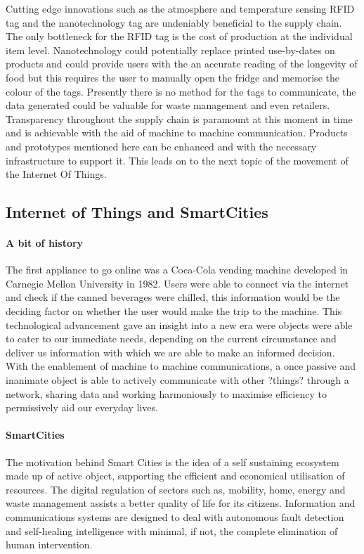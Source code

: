 \documentclass[a4paper, 11pt]{article}
\begin{document}
Cutting edge innovations such as the atmosphere and temperature sensing RFID tag and the nanotechnology tag are undeniably beneficial to the supply chain. The only bottleneck for the RFID  tag is the cost of production at the individual item level. Nanotechnology could potentially replace printed use-by-dates on products  and could provide users with the an accurate reading of the longevity of food but this requires the user to manually open the fridge and memorise the colour of the tags. Presently there is no method for the tags to communicate, the data generated could be valuable for waste management and even retailers. Transparency throughout the supply chain is paramount at this moment in time and is achievable with the aid of machine to machine communication. Products and prototypes mentioned here can be enhanced and with the necessary infrastructure to support it. This leads on to the next topic of the movement of the Internet Of Things.

\vspace{\baselineskip}
\vspace{\baselineskip}
\vspace{\baselineskip}


\subsection{Internet of Things and SmartCities}
\paragraph{A bit of history} The first appliance to go online was a Coca-Cola vending machine developed in Carnegie Mellon University in 1982. Users were able to connect via the internet and check if the canned beverages were chilled, this information would be the deciding factor on whether the user would make the trip to the machine. This technological advancement gave an insight into a new era were objects were able to cater to our immediate needs, depending on the current circumstance and deliver us information with which we are able to make an informed decision. With the enablement of machine to machine communications, a once passive and inanimate object is able to actively communicate with other ?things? through a network, sharing data and working harmoniously to maximise efficiency to permissively aid our everyday lives.

\paragraph{SmartCities} The motivation behind Smart Cities is the idea of a self sustaining ecosystem made up of active object, supporting the efficient and economical utilisation of resources. The digital regulation of sectors such as, mobility, home, energy and waste management assists a better quality of life for its citizens. Information and communications systems are designed to deal with autonomous fault detection and self-healing intelligence with minimal, if not, the complete elimination of human intervention. 
\end{document}
